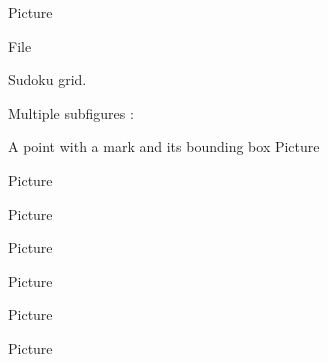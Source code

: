 Picture 
\begin{center}

\end{center}


File 
\begin{center}
   
\end{center}
   

Sudoku grid.

\begin{center}
   
\end{center}
   

   \clearpage

Multiple subfigures :

A point with a mark and its bounding box
Picture 
\Huge

\begin{center}
   
\end{center}
\normalsize


Picture 
\begin{center}
   
\end{center}
   

Picture 
\begin{center}
   
\end{center}



Picture 
\begin{center}

\end{center}


Picture 
\begin{center}
   
\end{center}


Picture 
\begin{center}
   
\end{center}


Picture 
\begin{center}
   
\end{center}


